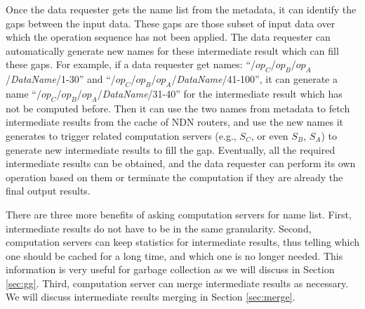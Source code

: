 Once the data requester gets the name list from the metadata, it can identify the gaps between the input data.  
These gaps are those subset of input data over which the operation sequence has not been applied.  
The data requester can automatically generate new names for these intermediate result which can fill these gaps. 
For example, if a data requester get names: ``/$op_C$/$op_B$/$op_A$/{\it DataName}/1-30'' and ``/$op_C$/$op_B$/$op_A$/{\it DataName}/41-100'', it can generate a name ``/$op_C$/$op_B$/$op_A$/{\it DataName}/31-40'' for the intermediate result which has not be computed before.  
Then it can use the two names from metadata to fetch intermediate results from the cache of NDN routers, and use the new names it generates to trigger related computation servers (e.g., $S_C$, or even $S_B$, $S_A$) to generate new intermediate results to fill the gap.  
Eventually, all the required intermediate results can be obtained, and the data requester can perform its own operation based on them or terminate the computation if they are already the final output results.

There are three more benefits of asking computation servers for name list.  
First, intermediate results do not have to be in the same granularity.  
Second, computation servers can keep statistics for intermediate results, thus telling which one should be cached for a long time, and which one is no longer needed. 
This information is very useful for garbage collection as we will discuss in Section \ref{sec:gg}.
Third, computation server can merge intermediate results as necessary. We will discuss intermediate results merging in Section \ref{sec:merge}.
